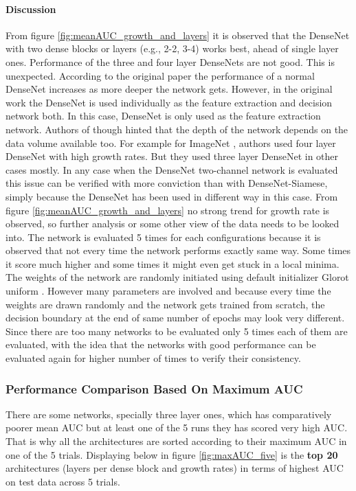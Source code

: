 \paragraph{Discussion\\}
From figure \ref{fig:meanAUC_growth_and_layers} it is observed that the DenseNet with two dense blocks or layers (e.g., 2-2, 3-4) works best, ahead of single layer ones. Performance of the three and four layer DenseNets are not 
good. This is unexpected. According to the original paper \cite{densenet} the performance of a normal DenseNet increases as more deeper the network gets. However, in the original work the DenseNet is used individually as the 
feature extraction and decision network both. In this case, DenseNet is only used as the feature extraction network. Authors of \cite{densenet} though hinted that the depth of the network depends on the data volume available too.
For example for ImageNet \cite{imagenet}, authors used four layer DenseNet with high growth rates. But they used three layer DenseNet in other cases mostly. In any case when the DenseNet two-channel network is evaluated this issue can be 
verified with more conviction than with DenseNet-Siamese, simply because the DenseNet has been used in different way in this case. From figure \ref{fig:meanAUC_growth_and_layers} no strong trend for growth rate is observed, so 
further analysis or some other view of the data needs to be looked into. 
The network is evaluated 5 times for each configurations because it is observed that not every time the network performs exactly same way. Some times
it score much higher and some times it might even get stuck in a local minima. The weights of the network are randomly initiated using default initializer Glorot uniform \cite{kerasinit}. However many parameters are involved 
and because every time the weights are drawn randomly and the network gets trained from scratch, the decision boundary at the end of same number of epochs may look very different. Since there are too many networks to be evaluated
only 5 times each of them are evaluated, with the idea that the networks with good performance can be evaluated again for higher number of times to verify their consistency. 

\subsubsection{Performance Comparison Based On Maximum AUC}

There are some networks, specially three layer ones, which has comparatively poorer mean AUC but at least one of the 5 runs they has scored very high AUC. That is why all the architectures are sorted according to their maximum AUC in one
of the 5 trials. Displaying below in figure \ref{fig:maxAUC_five} is the \textbf{top 20} architectures (layers per dense block and growth rates) in terms of highest AUC on test data across 5 trials.

